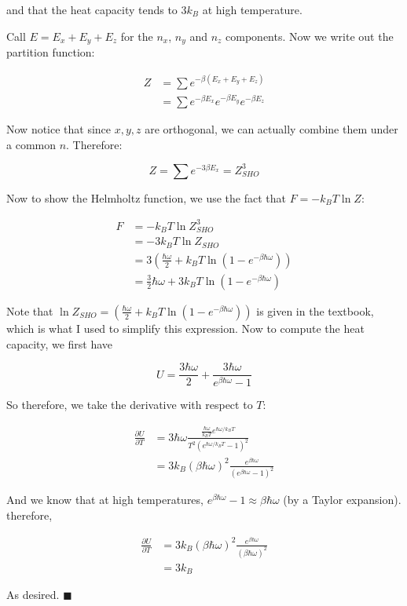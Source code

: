 \documentclass[10pt]{article}
\begin{document}
    and that the heat capacity tends to $3k_B$ at high temperature.


    \begin{solution}
        Call $E = E_x + E_y + E_z$ for the $n_x$, $n_y$ and $n_z$ components. Now we write out the partition function: 

        \begin{align*}
            Z &= \sum e^{-\beta(E_x + E_y + E_z)}\\
            &= \sum e^{-\beta E_x} e^{-\beta E_y} e^{-\beta E_z}
        \end{align*}

        Now notice that since $x, y, z$ are orthogonal, we can actually combine them under a common $n$. Therefore:

        \[ Z = \sum e^{-3\beta E_x} = Z_{SHO}^3\]

        Now to show the Helmholtz function, we use the fact that $F = -k_BT \ln Z$:

        \begin{align*}
            F &= -k_BT \ln Z_{SHO}^3\\
            &= -3k_BT \ln Z_{SHO}\\
            &= 3\left(\frac{\hbar \omega}{2} + k_BT \ln (1- e^{-\beta \hbar \omega})\right)\\
            &= \frac{3}{2} \hbar \omega + 3k_BT\ln (1 - e^{-\beta \hbar \omega})
        \end{align*}

        Note that $\ln Z_{SHO} = \left(\frac{\hbar \omega}{2} + k_BT \ln (1- e^{-\beta \hbar \omega})\right)$ is given in the textbook, which is what I used to simplify this expression. Now to compute the heat capacity, we first have 

        \[ U = \frac{3\hbar \omega}{2} + \frac{3\hbar \omega}{e^{\beta \hbar \omega} - 1}\]

        So therefore, we take the derivative with respect to $T$: 

        \begin{align*}
            \frac{\partial U}{\partial T} &= 3\hbar \omega \frac{\frac{\hbar \omega}{k_BT} e^{\hbar \omega/k_BT}}{T^2\left(e^{\hbar \omega/k_BT} -1\right)^2}\\
            &= 3k_B(\beta \hbar \omega)^2\frac{e^{\beta \hbar \omega}}{\left(e^{\beta \hbar \omega} - 1\right)^2}
        \end{align*}


        And we know that at high temperatures, $e^{\beta \hbar \omega} - 1 \approx \beta \hbar \omega$ (by a Taylor expansion). therefore, 

        \begin{align*}
            \frac{\partial U}{\partial T} &= 3k_B(\beta \hbar \omega)^2 \frac{e^{\beta \hbar \omega}}{(\beta \hbar \omega)^2}\\
            &= 3k_B
        \end{align*}

        As desired. $\blacksquare$
    \end{solution}
\end{document}
